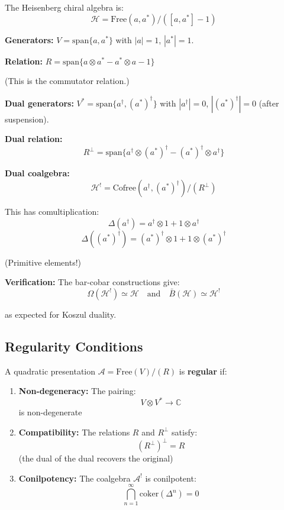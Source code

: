 \begin{example}\label{ex:heisenberg-quadratic-dual}
The Heisenberg chiral algebra is:
$$\mathcal{H} = \text{Free}(a, a^*) / ([a, a^*] - 1)$$

\textbf{Generators:} $V = \text{span}\{a, a^*\}$ with $|a| = 1$, $|a^*| = 1$.

\textbf{Relation:} $R = \text{span}\{a \otimes a^* - a^* \otimes a - 1\}$

(This is the commutator relation.)

\textbf{Dual generators:} $V^* = \text{span}\{a^{\dagger}, (a^*)^{\dagger}\}$ with 
$|a^{\dagger}| = 0$, $|(a^*)^{\dagger}| = 0$ (after suspension).

\textbf{Dual relation:} 
$$R^\perp = \text{span}\{a^{\dagger} \otimes (a^*)^{\dagger} - (a^*)^{\dagger} 
\otimes a^{\dagger}\}$$

\textbf{Dual coalgebra:}
$$\mathcal{H}^! = \text{Cofree}(a^{\dagger}, (a^*)^{\dagger}) / (R^\perp)$$

This has comultiplication:
$$\Delta(a^{\dagger}) = a^{\dagger} \otimes 1 + 1 \otimes a^{\dagger}$$
$$\Delta((a^*)^{\dagger}) = (a^*)^{\dagger} \otimes 1 + 1 \otimes (a^*)^{\dagger}$$

(Primitive elements!)

\textbf{Verification:} The bar-cobar constructions give:
$$\Omega(\mathcal{H}^!) \simeq \mathcal{H} \quad \text{and} \quad 
\bar{B}(\mathcal{H}) \simeq \mathcal{H}^!$$

as expected for Koszul duality.
\end{example}

\subsection{Regularity Conditions}

\begin{definition}\label{def:quadratic-regularity}
A quadratic presentation $\mathcal{A} = \text{Free}(V) / (R)$ is \textbf{regular} if:
\begin{enumerate}
\item \textbf{Non-degeneracy:} The pairing:
      $$V \otimes V^* \to \mathbb{C}$$
      is non-degenerate
      
\item \textbf{Compatibility:} The relations $R$ and $R^\perp$ satisfy:
      $$(R^\perp)^\perp = R$$
      (the dual of the dual recovers the original)
      
\item \textbf{Conilpotency:} The coalgebra $\mathcal{A}^!$ is conilpotent:
      $$\bigcap_{n=1}^\infty \text{coker}(\Delta^n) = 0$$
\end{enumerate}
\end{definition}

